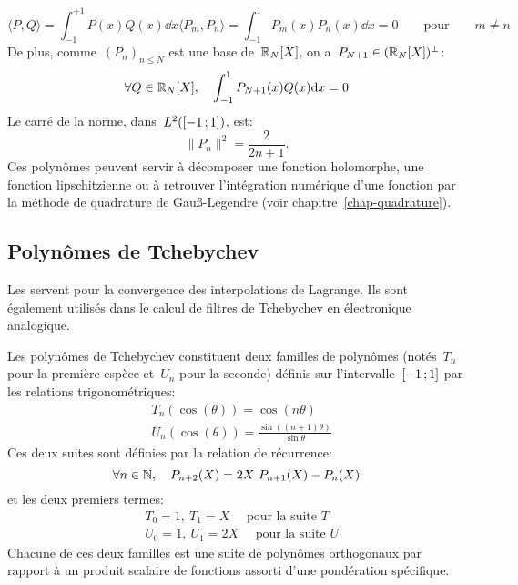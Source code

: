\begin{equation}
\langle P,Q\rangle= \int_{-1}^{+1} P(x) Q(x)\dd x \langle P_m,P_n\rangle= \int_{-1}^{1} P_m(x)P_n(x)\dd x = 0\qquad \mathrm{pour}\qquad m \ne n 
\end{equation}
De plus, comme~$(P_n)_{n\leq N}$ est une base de~$\mathbb R_N[X]$, on a~$P_{N+1} \in (\mathbb R_N[X])^\bot$: 
\begin{equation}
\forall Q \in \mathbb R_N[X],\quad \int_{-1}^{1} P_{N+1}(x)Q(x)\text{d} x = 0 
\end{equation}
Le carré de la norme, dans~$L^2(\mathopen{[}-1\,;1\mathclose{]})$, est: 
\begin{equation}
 \|P_n\|^2=\frac{2}{2n+1}. 
\end{equation}
Ces polynômes peuvent servir à décomposer une fonction holomorphe, une fonction lipschitzienne ou à retrouver l'intégration numérique d'une fonction par la méthode de quadrature de Gauß-Legendre (voir chapitre~\ref{chap-quadrature}). 
\subsection{Polynômes de Tchebychev} 
Les  servent pour la convergence des interpolations de Lagrange. Ils sont également utilisés dans le calcul de filtres de Tchebychev en électronique analogique. 

Les polynômes de Tchebychev constituent deux familles de polynômes (notés~$T_n$ pour la première espèce et~$U_n$ pour la seconde) définis sur l'intervalle~$\mathopen{[}-1\,;1\mathclose{]}$ par les relations trigonométriques: 
\begin{align}
&T_n(\cos(\theta))=\cos(n\theta)\\
&U_n(\cos(\theta))=\frac{\sin((n+1) \theta)}{\sin \theta} 
\end{align}
Ces deux suites sont définies par la relation de récurrence: 
\begin{equation}
\forall n\in\mathbb N,\quad P_{n+2}(X)=2X~P_{n+1}(X)-P_n(X) 
\end{equation}
et les deux premiers termes: 
\begin{align}
&T_0=1,~T_1=X \quad \text{ pour la suite } T\\
&U_0=1,~U_1=2X \quad \text{ pour la suite } U 
\end{align}
Chacune de ces deux familles est une suite de polynômes orthogonaux par rapport à un produit scalaire de fonctions assorti d'une pondération spécifique. 
